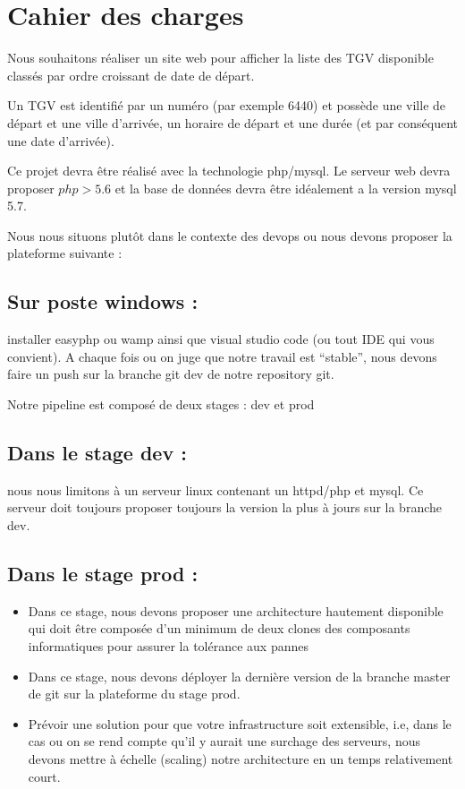 \section{Cahier des charges}
Nous souhaitons réaliser un site web pour afficher la liste des TGV disponible
classés par ordre croissant de date de départ.

Un TGV est identifié par un numéro (par exemple 6440) et possède une ville de
départ et une ville d’arrivée, un horaire de départ et une durée (et par conséquent
une date d’arrivée).

Ce projet devra être réalisé avec la technologie php/mysql. Le serveur web devra
proposer $php >5.6$ et la base de données devra être idéalement a la version mysql
5.7.

Nous nous situons plutôt dans le contexte des devops ou nous devons proposer la
plateforme suivante :

\subsection{Sur poste windows :}
installer easyphp ou wamp ainsi que visual studio code (ou
tout IDE qui vous convient). A chaque fois ou on juge que notre travail est “stable”,
nous devons faire un push sur la branche git dev de notre repository git.

Notre pipeline est composé de deux stages : dev et prod

\subsection{Dans le stage dev :}
nous nous limitons à un serveur linux contenant un httpd/php
et mysql. Ce serveur doit toujours proposer toujours la version la plus à jours sur la
branche dev.

\subsection{Dans le stage prod :}
\begin{itemize}
  \item Dans ce stage, nous devons proposer une architecture hautement disponible
qui doit être composée d’un minimum de deux clones des composants
informatiques pour assurer la tolérance aux pannes
  \item Dans ce stage, nous devons déployer la dernière version de la branche
    master de git sur la plateforme du stage prod.
  \item Prévoir une solution pour que votre infrastructure soit extensible, i.e, dans le
cas ou on se rend compte qu’il y aurait une surchage des serveurs, nous devons mettre à échelle (scaling) notre architecture en un temps
relativement court.
\end{itemize}

